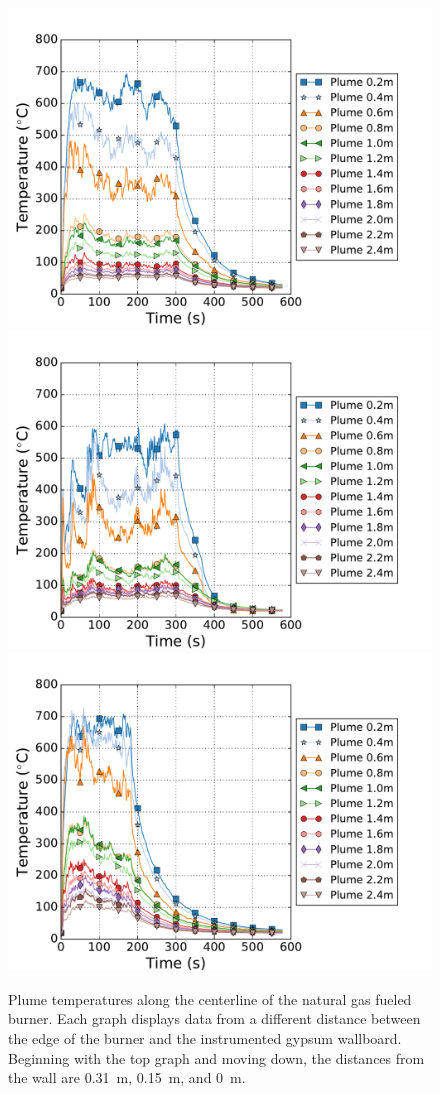 \documentclass[twoside]{uocthesis}
\begin{document}
{\begin{figure}[ht!]
	\centering
	\includegraphics[width=.625\columnwidth]{../Figures/IWGBNG01_TC_Plume_Avg}\\
	\includegraphics[width=.625\columnwidth]{../Figures/IWGBNG04_TC_Plume_Avg}\\
	\includegraphics[width=.625\columnwidth]{../Figures/IWGBNG05_TC_Plume_Avg}\\
	\caption[Plume temperatures for the natural gas fueled burner]{Plume temperatures along the centerline of the natural gas fueled burner.    Each graph displays data from a different distance between the edge of the burner and the instrumented gypsum wallboard.  Beginning with the top graph and moving down, the distances from the wall are 0.31~m, 0.15~m, and 0~m.}
	\label{IWGB_NG_TC_Plume_set}
\end{figure}

}
\end{document}
